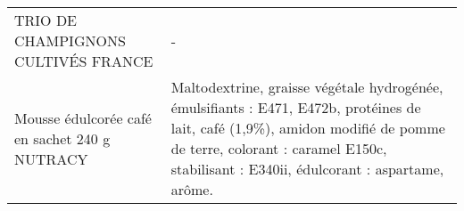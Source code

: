 \begin{longtable}{p{5cm}p{10cm}}
                                                                      TRIO DE CHAMPIGNONS CULTIVÉS FRANCE &                                                                                                                                                                                                                                                                                                                                                                                                                                                                                                                                                                                                                                                                                                                                                                                                                                                                                                                                                                                                                                        - \\
                                                            Mousse édulcorée café en sachet 240 g NUTRACY &                                                                                                                                                                                                                                                                                                                                                                                                                                                                                                                                                                                                                                                                                                                                                                                                                 Maltodextrine, graisse végétale hydrogénée, émulsifiants : E471, E472b, protéines de lait, café (1,9\%), amidon modifié de pomme de terre, colorant : caramel E150c, stabilisant : E340ii, édulcorant : aspartame, arôme. \\

\end{longtable}
